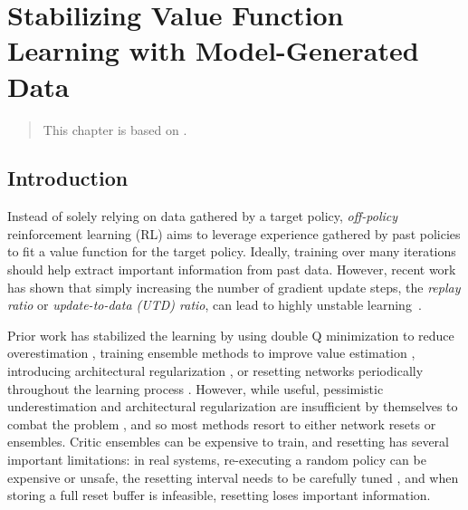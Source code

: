 \chapter{Stabilizing Value Function Learning with Model-Generated Data}
\label{chap:mad}

\begin{quote}
    This chapter is based on .
\end{quote}


\newcommand{\blue}[1]{{\color{uoftoceanblue} #1}}
\newcommand{\red}[1]{{\color{uoftred} #1}}

\section{Introduction}

Instead of solely relying on data gathered by a target policy, \emph{off-policy} reinforcement learning (RL) aims to leverage experience gathered by past policies \parencite{sutton2018introduction} to fit a value function for the target policy. 
Ideally, training over many iterations should help extract important information from past data.
However, recent work has shown that simply increasing the number of gradient update steps, the \emph{replay ratio} or \emph{update-to-data (UTD) ratio}, can lead to highly unstable learning~\parencite{nikishin2022primacy,doro2023barrier,hussing2024dissecting,nauman2024bigger}.

Prior work has stabilized the learning by using double Q minimization to reduce overestimation \parencite{fujimoto2018addressing}, training ensemble methods to improve value estimation \parencite{chen2020randomized,hiraoka2022dropout}, introducing architectural regularization \parencite{hussing2024dissecting,nauman2024bigger}, or resetting networks periodically throughout the learning process \parencite{doro2023barrier,schwarzer2023bigger,nauman2024bigger}.
However, while useful, pessimistic underestimation and architectural regularization are insufficient by themselves  to combat the problem \parencite{hussing2024dissecting}, and so most methods resort to either network resets or ensembles.
Critic ensembles can be expensive to train, and resetting has several important limitations: in real systems, re-executing a random policy can be expensive or unsafe, the resetting interval needs to be carefully tuned \parencite{hussing2024dissecting}, and when storing a full reset buffer is infeasible, resetting loses important information.

